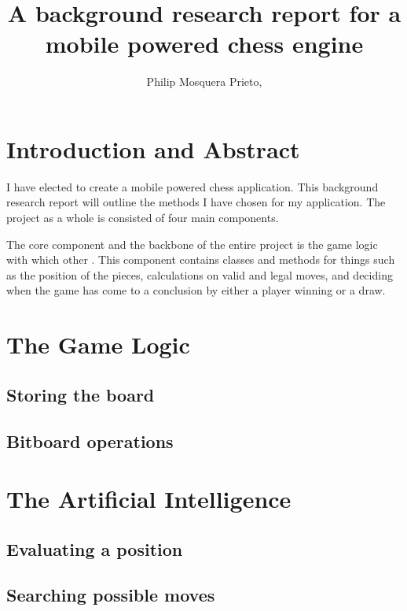 \documentclass[12pt]{report}
\begin{document}
\title{A background research report for a mobile powered chess engine}
\author{Philip Mosquera Prieto,}
\maketitle

\tableofcontents

\chapter{Introduction and Abstract}


I have elected to create a mobile powered chess application. This background research report will outline the methods I have chosen for my application. The project as a whole is consisted of four main components. \newline

The core component and the backbone of the entire project is the game logic with which other . This component contains classes and methods for things such as the position of the pieces, calculations on valid and legal moves, and deciding when the game has come to a conclusion by either a player winning or a draw.

\chapter{The Game Logic}

\section{Storing the board}

\section{Bitboard operations}


\chapter{The Artificial Intelligence}

\section{Evaluating a position}

\section{Searching possible moves}
\end{document}
